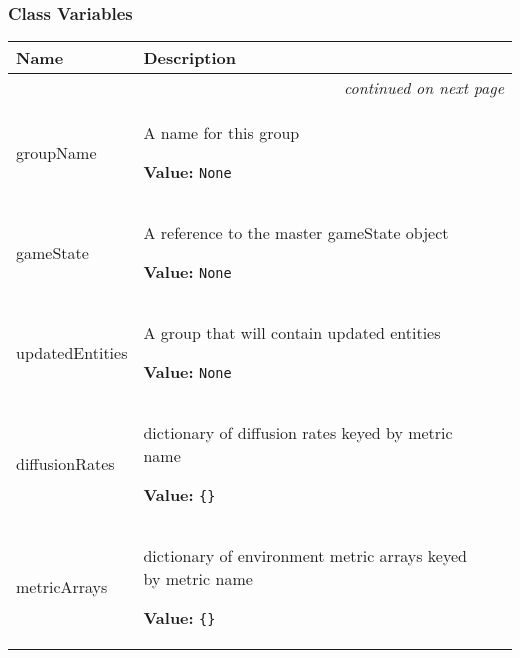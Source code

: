 
  \subsubsection{Class Variables}

    \vspace{-1cm}
\hspace{\varindent}\begin{longtable}{|p{\varnamewidth}|p{\vardescrwidth}|l}
\cline{1-2}
\cline{1-2} \centering \textbf{Name} & \centering \textbf{Description}& \\
\cline{1-2}
\endhead\cline{1-2}\multicolumn{3}{r}{\small\textit{continued on next page}}\\\endfoot\cline{1-2}
\endlastfoot\raggedright g\-r\-o\-u\-p\-N\-a\-m\-e\- & \raggedright A name for this group

\textbf{Value:} 
{\tt None}&\\
\cline{1-2}
\raggedright g\-a\-m\-e\-S\-t\-a\-t\-e\- & \raggedright A reference to the master gameState object

\textbf{Value:} 
{\tt None}&\\
\cline{1-2}
\raggedright u\-p\-d\-a\-t\-e\-d\-E\-n\-t\-i\-t\-i\-e\-s\- & \raggedright A group that will contain updated entities

\textbf{Value:} 
{\tt None}&\\
\cline{1-2}
\raggedright d\-i\-f\-f\-u\-s\-i\-o\-n\-R\-a\-t\-e\-s\- & \raggedright dictionary of diffusion rates keyed by metric name

\textbf{Value:} 
{\tt \{\}}&\\
\cline{1-2}
\raggedright m\-e\-t\-r\-i\-c\-A\-r\-r\-a\-y\-s\- & \raggedright dictionary of environment metric arrays keyed by metric name

\textbf{Value:} 
{\tt \{\}}&\\
\cline{1-2}
\end{longtable}

